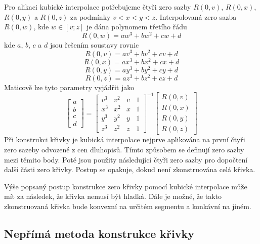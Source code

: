 \documentclass[a4paper]{book}
\begin{document}
Pro alikaci kubické interpolace potřebujeme čtyři zero sazby $R(0,v)$, $R(0,x)$, $R(0,y)$ a $R(0,z)$ za podmínky $v < x < y < z$. Interpolovaná zero sazba $R(0,w)$, kde $w \in [v; z]$ je dána polynomem třetího řádu
\begin{equation*}
R(0,w) = aw^3 + bw^2 + cw + d
\end{equation*}
kde $a$, $b$, $c$ a $d$ jsou řešením soustavy rovnic
\begin{equation*}
R(0,v) = av^3 + bv^2 + cv + d
\end{equation*}
\begin{equation*}
R(0,x) = ax^3 + bx^2 + cx + d
\end{equation*}
\begin{equation*}
R(0,y) = ay^3 + by^2 + cy + d
\end{equation*}
\begin{equation*}
R(0,z) = az^3 + bz^2 + cz + d
\end{equation*}
Maticově lze tyto parametry vyjádřit jako
\begin{equation*}
\begin{bmatrix}
a \\ b \\ c \\ d
\end{bmatrix}
=
\begin{bmatrix}
v^3 & v^2 & v & 1 \\
x^3 & x^2 & x & 1 \\
y^3 & y^2 & y & 1 \\
z^3 & z^2 & z & 1
\end{bmatrix}^{-1}
\begin{bmatrix}
R(0, v) \\
R(0, x) \\
R(0, y) \\
R(0, z)
\end{bmatrix}
\end{equation*}
Při konstrukci křivky je kubická interpolace nejprve aplikována na první čtyři zero sazeby odvozené z cen dluhopisů. Tímto způsobem se definují zero sazby mezi těmito body. Poté jsou použity následující čtyři zero sazby pro dopočtení další části zero křivky. Postup se opakuje, dokud není zkonstruována celá křivka.

Výše popsaný postup konstrukce zero křivky pomocí kubické interpolace může mít za následek, že křivka nemusí být hladká. Dále je možné, že takto zkonstruovaná křivka bude konvexní na určitém segmentu a konkávní na jiném.

\subsection{Nepřímá metoda konstrukce křivky}
\end{document}
